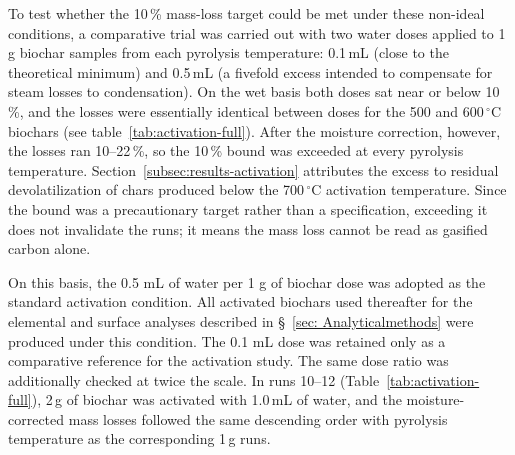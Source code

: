 To test whether the 10\,\% mass-loss target could be met under these non-ideal conditions, a comparative trial was carried out with two water doses applied to 1\,g biochar samples from each pyrolysis temperature: 0.1\,mL (close to the theoretical minimum) and 0.5\,mL (a fivefold excess intended to compensate for steam losses to condensation). On the wet basis both doses sat near or below 10\,\%, and the losses were essentially identical between doses for the 500 and 600\,$^{\circ}$C biochars (see table~\ref{tab:activation-full}). After the moisture correction, however, the losses ran 10--22\,\%, so the 10\,\% bound was exceeded at every pyrolysis temperature. Section~\ref{subsec:results-activation} attributes the excess to residual devolatilization of chars produced below the 700\,$^{\circ}$C activation temperature. Since the bound was a precautionary target rather than a specification, exceeding it does not invalidate the runs; it means the mass loss cannot be read as gasified carbon alone.

\vspace{0.3em}

On this basis, the 0.5 mL of water per 1 g of biochar dose was adopted as the standard activation condition. All activated biochars used thereafter for the elemental and surface analyses described in \S~\ref{sec: Analyticalmethods} were produced under this condition. The 0.1 mL dose was retained only as a comparative reference for the activation study. The same dose ratio was additionally checked at twice the scale. In runs 10--12 (Table~\ref{tab:activation-full}), 2\,g of biochar was activated with 1.0\,mL of water, and the
moisture-corrected mass losses followed the same descending order with pyrolysis temperature as
the corresponding 1\,g runs.

